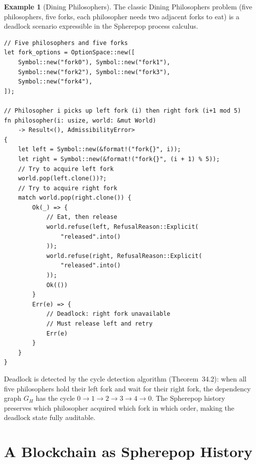 \documentclass[12pt, a4paper, openany]{book}
\theoremstyle{plain}
\theoremstyle{definition}
\newtheorem{example}[theorem]{Example}
\theoremstyle{remark}
\begin{document}
\begin{example}[Dining Philosophers]
The classic Dining Philosophers problem (five philosophers, five forks, each
philosopher needs two adjacent forks to eat) is a deadlock scenario expressible
in the Spherepop process calculus.
\begin{lstlisting}[style=rust, caption={Dining philosophers as Spherepop}]
// Five philosophers and five forks
let fork_options = OptionSpace::new([
    Symbol::new("fork0"), Symbol::new("fork1"),
    Symbol::new("fork2"), Symbol::new("fork3"),
    Symbol::new("fork4"),
]);

// Philosopher i picks up left fork (i) then right fork (i+1 mod 5)
fn philosopher(i: usize, world: &mut World)
    -> Result<(), AdmissibilityError>
{
    let left = Symbol::new(&format!("fork{}", i));
    let right = Symbol::new(&format!("fork{}", (i + 1) % 5));
    // Try to acquire left fork
    world.pop(left.clone())?;
    // Try to acquire right fork
    match world.pop(right.clone()) {
        Ok(_) => {
            // Eat, then release
            world.refuse(left, RefusalReason::Explicit(
                "released".into()
            ));
            world.refuse(right, RefusalReason::Explicit(
                "released".into()
            ));
            Ok(())
        }
        Err(e) => {
            // Deadlock: right fork unavailable
            // Must release left and retry
            Err(e)
        }
    }
}
\end{lstlisting}
Deadlock is detected by the cycle detection algorithm (Theorem~34.2): when all
five philosophers hold their left fork and wait for their right fork, the
dependency graph $G_H$ has the cycle $0 \to 1 \to 2 \to 3 \to 4 \to 0$.
The Spherepop history preserves which philosopher acquired which fork in which
order, making the deadlock state fully auditable.
\end{example}

\section{A Blockchain as Spherepop History}
\end{document}
